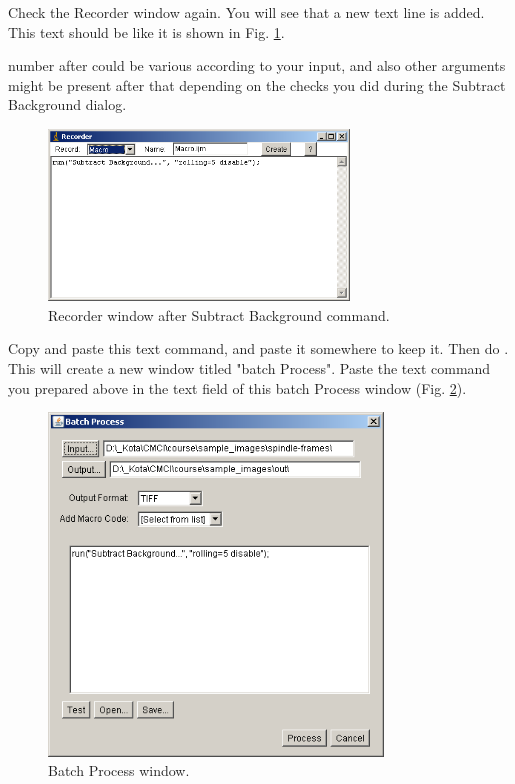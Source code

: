 \begin{indentexercise}{1}
Check the Recorder window again. You will see that a new text line is
added. This text should be like it is shown in Fig. \ref{fig:img73}.

\begin{quote}
\end{quote}

number after  could be
various according to your input, and also other arguments might be
present after that depending on the checks you did during the Subtract
Background dialog. 
\begin{figure}[htbp]
\begin{center}
\includegraphics[width=8cm]{img/CMCIBasicCourse201102-img73.png}
\caption{ Recorder window after Subtract Background command.}
\label{fig:img73}
\end{center}
\end{figure}

Copy and paste this text command, and paste it somewhere to keep it.
Then do . This will create a new window titled
"batch Process". Paste the text
command you prepared above in the text field of this batch Process
window (Fig. \ref{fig:img74}). 

\begin{figure}[htbp]
\begin{center}
\includegraphics[width=8.881cm,height=9.116cm]{img/CMCIBasicCourse201102-img74.png}
\caption{ Batch Process window.}
\label{fig:img74}
\end{center}
\end{figure}



\end{indentexercise}
